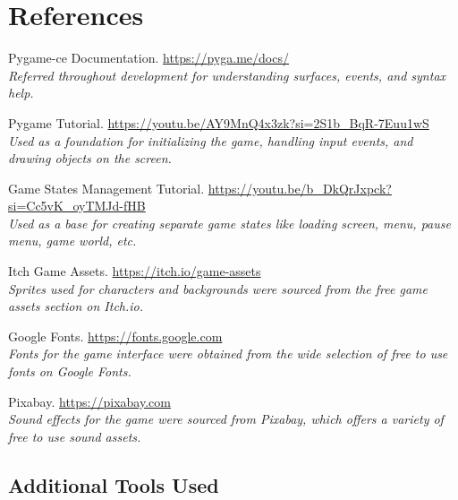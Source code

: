 \documentclass[10.5pt]{article}
\begin{document}
\section{References}

\begin{thebibliography}{9}

Pygame-ce Documentation. \url{https://pyga.me/docs/} \\
\textit{Referred throughout development for understanding surfaces, events, and syntax help.}

Pygame Tutorial. \url{https://youtu.be/AY9MnQ4x3zk?si=2S1b_BqR-7Euu1wS} \\
\textit{Used as a foundation for initializing the game, handling input events, and drawing objects on the screen.}

Game States Management Tutorial. \url{https://youtu.be/b_DkQrJxpck?si=Cc5vK_oyTMJd-fHB} \\
\textit{Used as a base for creating separate game states like loading screen, menu, pause menu, game world, etc.}

Itch Game Assets. \url{https://itch.io/game-assets} \\
\textit{Sprites used for characters and backgrounds were sourced from the free game assets section on Itch.io.}

Google Fonts. \url{https://fonts.google.com} \\
\textit{Fonts for the game interface were obtained from the wide selection of free to use fonts on Google Fonts.}

Pixabay. \url{https://pixabay.com} \\
\textit{Sound effects for the game were sourced from Pixabay, which offers a variety of free to use sound assets.}
\end{thebibliography}

\subsection*{Additional Tools Used}
\end{document}
